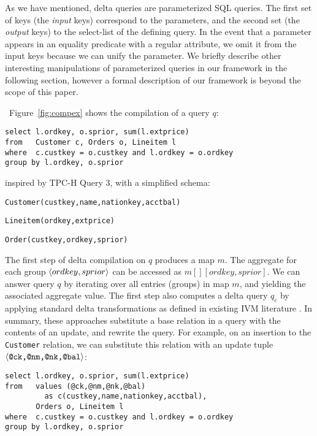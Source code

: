 As we have mentioned, delta queries are parameterized SQL queries. The first set
of keys (the \textit{input} keys) correspond to the parameters, and the second
set (the \textit{output} keys) to the select-list of the defining query. In the
event that a parameter appears in an equality predicate with a regular
attribute, we omit it from the input keys because we can unify the parameter. We
briefly describe other interesting manipulations of parameterized queries in our
framework in the following section, however a formal description of our
framework is beyond the scope of this paper.

~Figure~\ref{fig:compex} shows the compilation of a query
$q$:

{\footnotesize\begin{verbatim}
select l.ordkey, o.sprior, sum(l.extprice)
from   Customer c, Orders o, Lineitem l
where  c.custkey = o.custkey and l.ordkey = o.ordkey
group by l.ordkey, o.sprior
\end{verbatim}}


\noindent inspired by TPC-H Query 3, with a simplified schema:

\vspace{1mm}
\texttt{Customer(custkey,name,nationkey,acctbal)}

\texttt{Lineitem(ordkey,extprice)}

\texttt{Order(custkey,ordkey,sprior)}

\vspace{1mm}
\noindent 
The first step of delta compilation on $q$ produces a map $m$. The aggregate for
each group ${\langle ordkey,sprior\rangle}$ can be accessed as $m[][ordkey,sprior]$. We
can answer query $q$ by iterating over all entries (groups) in map $m$, and
yielding the associated aggregate value.
The first step also computes a delta query $q_{c}$ by applying standard
delta transformations as defined in existing IVM literature
\cite{griffin-sigmod:95,roussopoulos-tods:91,zhou-icde:07,zhou-vldb:07}. In
summary, these approaches substitute a base relation in a query with the
contents of an update, and rewrite the query. For example, on an insertion to
the {\tt Customer} relation, we can substitute this relation
with an update tuple ${\langle\mbox{{\tt @ck,@nm,@nk,@bal}}\rangle}$:

\begin{verbatim}
select l.ordkey, o.sprior, sum(l.extprice)
from   values (@ck,@nm,@nk,@bal)
         as c(custkey,name,nationkey,acctbal),
       Orders o, Lineitem l
where  c.custkey = o.custkey and l.ordkey = o.ordkey
group by l.ordkey, o.sprior
\end{verbatim}

